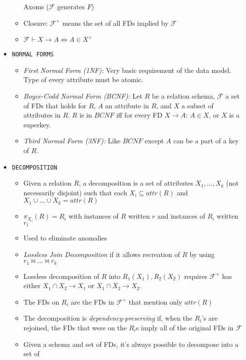 \documentclass[landscape,8pt]{extarticle}
\newcommand{\code}{\lstinline}
\begin{document}
\begin{multicols}{4}
\begin{itemize}
\begin{itemize}
        Axoms ($\mathcal{F}$ generates $F$)
        \item Closure: $\mathcal{F}^+$ means the set of all FDs implied by $\mathcal{F}$
        \item $\mathcal{F} \vdash X \rightarrow A \iff A \in X^+$
    \end{itemize}
    \item \code{NORMAL FORMS}
    \begin{itemize}
        \item \emph{First Normal Form (1NF):} Very basic requirement of the data model. Type of
        every attribute must be atomic.
        \item \emph{Boyce-Codd Normal Form (BCNF):} Let $R$ be a relation schema, $\mathcal{F}$ a
        set of FDs that holds for $R$, $A$ an attribute in $R$, and $X$ a subset of attributes in
        $R$. $R$ is in $BCNF$ iff for every FD $X \rightarrow A$: $A \in X$, or $X$ is a superkey.
        \item \emph{Third Normal Form (3NF):} Like $BCNF$ except $A$ can be a part of a key of $R$.
    \end{itemize}
    \item \code{DECOMPOSITION}
    \begin{itemize}
        \item Given a relation $R$, a decomposition is a set of attributes $X_1, \dots, X_k$ (not
        necessarily disjoint) such that each $X_i \subseteq attr(R)$ and $X_1 \cup \dots \cup X_k =
        attr(R)$
        \item $\pi_{X_i}(R) = R_i$ with instances of $R$ written $r$ and instances of $R_i$ written $r_i$
        \item Used to eliminate anomalies
        \item \emph{Lossless Join Decomposition} if it allows recreation of $R$ by using $r_1
        \bowtie \dots \bowtie r_k$
        \item Lossless decomposition of $R$ into $R_1(X_1), R_2(X_2)$ requires $\mathcal{F}^+$ has
        either $X_1 \cap X_2 \rightarrow X_1$ or $X_1 \cap X_2 \rightarrow X_2$.
        \item The FDs on $R_i$ are the FDs in $\mathcal{F}^+$ that mention only $attr(R)$
        \item The decomposition is \emph{dependency-preserving} if, when the $R_i$'s are rejoined,
        the FDs that were on the $R_i$s imply all of the original FDs in $\mathcal{F}$
        \item Given a schema and set of FDs, it's always possible to decompose into a set of 

\end{itemize}
\end{itemize}
\end{multicols}
\end{document}

